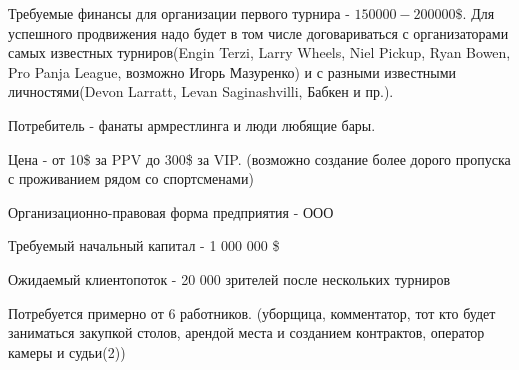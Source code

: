\documentclass[a4paper, 12pt]{article}
\begin{document}
	Требуемые финансы для организации первого турнира - $150 000 - 200 000 \$$. Для успешного продвижения надо будет в том числе договариваться с организаторами самых известных турниров(Engin Terzi, Larry Wheels, Niel Pickup, Ryan Bowen, Pro Panja League, возможно Игорь Мазуренко) и с разными известными личностями(Devon Larratt, Levan Saginashvilli, Бабкен и пр.). 
	
	Потребитель - фанаты армрестлинга и люди любящие бары.
	
	Цена - от 10\$ за PPV до 300\$ за VIP. (возможно создание более дорого пропуска с проживанием рядом со спортсменами)
	
	Организационно-правовая форма предприятия - ООО
	
	Требуемый начальный капитал - 1 000 000 \$
	
	Ожидаемый клиентопоток - 20 000 зрителей после нескольких турниров
	
	Потребуется примерно от 6 работников. (уборщица, комментатор, тот кто будет заниматься закупкой столов, арендой места и созданием контрактов, оператор камеры и судьи(2))
\end{document}
